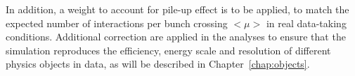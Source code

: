 In addition, a weight to account for pile-up effect is to 
be applied, to match the
expected number of interactions per bunch crossing $<\mu>$
 in real data-taking conditions. 
Additional correction are applied in the analyses
to ensure that the simulation reproduces the efficiency,
energy scale and resolution of different
physics objects in data, as will be described in
Chapter~\ref{chap:objects}.